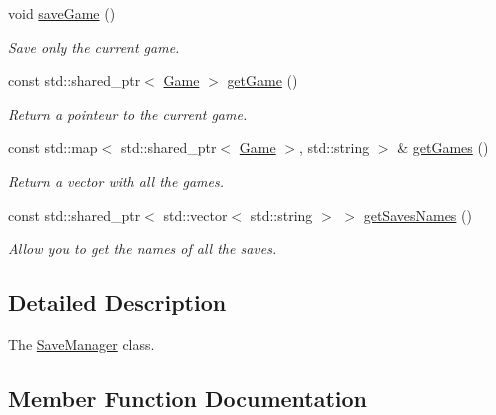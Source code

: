 \begin{DoxyCompactItemize}
\mbox{\label{classSaveManager_a6f5a49208d165ccaf6ef619f7005da55}} 
void \hyperlink{classSaveManager_a6f5a49208d165ccaf6ef619f7005da55}{save\+Game} ()
\begin{DoxyCompactList}\small\item\em Save only the current game. \end{DoxyCompactList}\item 
\mbox{\label{classSaveManager_a7b950ce71223640fe56e8d404fe3cd2f}} 
const std\+::shared\+\_\+ptr$<$ \hyperlink{classGame}{Game} $>$ \hyperlink{classSaveManager_a7b950ce71223640fe56e8d404fe3cd2f}{get\+Game} ()
\begin{DoxyCompactList}\small\item\em Return a pointeur to the current game. \end{DoxyCompactList}\item 
\mbox{\label{classSaveManager_a491eadac88e265ed32f54cfd722968d7}} 
const std\+::map$<$ std\+::shared\+\_\+ptr$<$ \hyperlink{classGame}{Game} $>$, std\+::string $>$ \& \hyperlink{classSaveManager_a491eadac88e265ed32f54cfd722968d7}{get\+Games} ()
\begin{DoxyCompactList}\small\item\em Return a vector with all the games. \end{DoxyCompactList}\item 
const std\+::shared\+\_\+ptr$<$ std\+::vector$<$ std\+::string $>$ $>$ \hyperlink{classSaveManager_a335611df31b6a1eccb5c7df73bc2e778}{get\+Saves\+Names} ()
\begin{DoxyCompactList}\small\item\em Allow you to get the names of all the saves. \end{DoxyCompactList}\end{DoxyCompactItemize}


\subsection{Detailed Description}
The \hyperlink{classSaveManager}{Save\+Manager} class. 

\subsection{Member Function Documentation}
\mbox{\label{classSaveManager_a335611df31b6a1eccb5c7df73bc2e778}} 
